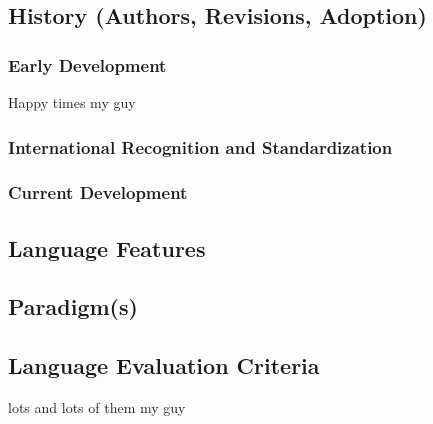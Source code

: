 \documentclass[12pt]{article}
\begin{document}
\subsection{History (Authors, Revisions, Adoption)}
\subsubsection{Early Development}
Happy times my guy
\subsubsection{International Recognition and Standardization}

\subsubsection{Current Development}

\subsection{Language Features}

\subsection{Paradigm(s)}

\subsection{Language Evaluation Criteria}
lots and lots of them my guy 
\end{document}
